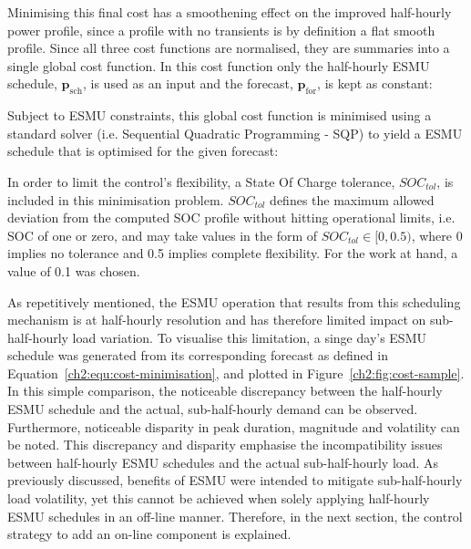 


Minimising this final cost has a smoothening effect on the improved half-hourly power profile, since a profile with no transients is by definition a flat smooth profile.
Since all three cost functions are normalised, they are summaries into a single global cost function.
In this cost function only the half-hourly ESMU schedule, $\textbf{p}_\text{sch}$, is used as an input and the forecast, $\textbf{p}_\text{for}$, is kept as constant:



Subject to ESMU constraints, this global cost function is minimised using a standard solver (i.e. Sequential Quadratic Programming - SQP) to yield a ESMU schedule that is optimised for the given forecast:



In order to limit the control's flexibility, a State Of Charge tolerance, $SOC_{tol}$, is included in this minimisation problem.
$SOC_{tol}$ defines the maximum allowed deviation from the computed SOC profile without hitting operational limits, i.e. SOC of one or zero, and may take values in the form of $SOC_{tol} \in [0, 0.5)$, where 0 implies no tolerance and 0.5 implies complete flexibility.
For the work at hand, a value of 0.1 was chosen.



As repetitively mentioned, the ESMU operation that results from this scheduling mechanism is at half-hourly resolution and has therefore limited impact on sub-half-hourly load variation.
To visualise this limitation, a singe day's ESMU schedule was generated from its corresponding forecast as defined in Equation~\ref{ch2:equ:cost-minimisation}, and plotted in Figure~\ref{ch2:fig:cost-sample}.
In this simple comparison, the noticeable discrepancy between the half-hourly ESMU schedule and the actual, sub-half-hourly demand can be observed.
Furthermore, noticeable disparity in peak duration, magnitude and volatility can be noted.
This discrepancy and disparity emphasise the incompatibility issues between half-hourly ESMU schedules and the actual sub-half-hourly load.
As previously discussed, benefits of ESMU were intended to mitigate sub-half-hourly load volatility, yet this cannot be achieved when solely applying half-hourly ESMU schedules in an off-line manner.
Therefore, in the next section, the control strategy to add an on-line component is explained.




 